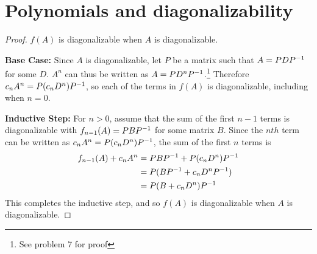 \section{Polynomials and diagonalizability}

\begin{proof}$f(A)$ is diagonalizable when $A$ is diagonalizable. \gap
       
    \textbf{Base Case:} Since $A$ is diagonalizable, 
    let $P$ be a matrix such that $A = PDP^{-1}$ for some $D$.
    $A^n$ can thus be written as $A = PD^nP^{-1}$.\footnote{See problem 7 for proof}
    Therefore $c_nA^n = P(c_nD^n)P^{-1}$, 
    so each of the terms in $f(A)$ is diagonalizable,
    including when $n=0$.\gap

    \textbf{Inductive Step:} For $n > 0$,
    assume that the sum of the first $n-1$ terms 
    is diagonalizable with $f_{n-1}(A) = PBP^{-1}$
    for some matrix $B$.
    Since the $nth$ term can be written as $c_nA^n = P(c_nD^n)P^{-1}$,
    the sum of the first $n$ terms is
    \begin{align}
        f_{n-1}(A) + c_nA^n
        &= PBP^{-1} +  P(c_nD^n)P^{-1}\\
        &= P(BP^{-1} + c_nD^nP^{-1})\\
        &= P(B + c_nD^n)P^{-1}
    \end{align}
    This completes the inductive step, and so 
    $f(A)$ is diagonalizable when $A$ is diagonalizable.
\end{proof}

